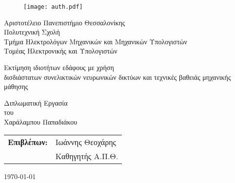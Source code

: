 \begin{titlepage}

\begin{figure}[H]
  \begin{center}
    \texttt{[image: auth.pdf]}
    \label{fig:cover_auth_logo}
  \end{center}
\end{figure}

\centering
\Large Αριστοτέλειο Πανεπιστήμιο Θεσσαλονίκης\\
\Large Πολυτεχνική Σχολή\\
\large Τμήμα Ηλεκτρολόγων Μηχανικών και Μηχανικών Υπολογιστών\\
\large Τομέας Ηλεκτρονικής και Υπολογιστών

\vspace{\fill}

\LARGE Εκτίμηση ιδιοτήτων εδάφους με χρήση\\
\LARGE δισδιάστατων συνελικτικών νευρωνικών δικτύων
\LARGE και τεχνικές βαθειάς μηχανικής μάθησης

\vspace{\fill}

\Large Διπλωματική Εργασία\\
\Large του\\
\Large Χαράλαμπου Παπαδιάκου

\vspace{\fill}
\raggedright

\begin{tabular}{ll}
\textbf{Επιβλέπων:} & Ιωάννης Θεοχάρης\\
 & Καθηγητής Α.Π.Θ.\\
\end{tabular}

\centering
\vspace{\fill}
\today

\end{titlepage}
\blankpage

